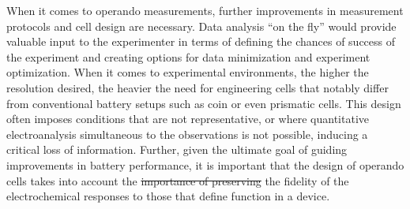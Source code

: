 \documentclass[journal=cmatex,manuscript=perspective]{achemso}
\providecommand{\DIFaddtex}[1]{{\protect\color{blue}\uwave{#1}}} %
\providecommand{\DIFdeltex}[1]{{\protect\color{red}\sout{#1}}}                      %
\providecommand{\DIFaddbegin}{} %
\providecommand{\DIFaddend}{} %
\providecommand{\DIFdelbegin}{} %
\providecommand{\DIFdelend}{} %
\providecommand{\DIFadd}[1]{\texorpdfstring{\DIFaddtex{#1}}{#1}} %
\providecommand{\DIFdel}[1]{\texorpdfstring{\DIFdeltex{#1}}{}} %
\begin{document}
When it comes to operando measurements, further improvements in
measurement protocols and cell design are necessary. Data analysis
``on the fly'' would provide valuable input to the experimenter in
terms of defining the chances of success of the experiment and
creating options for data minimization and experiment
optimization. When it comes to experimental environments, the higher
the resolution desired, the heavier the need for engineering cells
that notably differ from conventional battery setups such as coin or
even prismatic cells. This design often imposes conditions that are
not representative, or where quantitative electroanalysis simultaneous
to the observations is not possible, inducing a critical loss of
information. Further, given the ultimate goal of guiding improvements
in battery performance, it is important that the design of operando
cells takes into account the \DIFdelbegin \DIFdel{importance of preserving }\DIFdelend \DIFaddbegin \DIFadd{need to preserve }\DIFaddend the fidelity of the
electrochemical responses to those that define function in a device.
\end{document}
